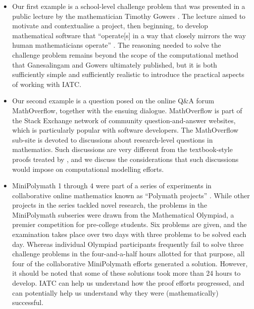 \documentclass[smallextended,oneside]{svjour3}       %
\let\cite\citep
\newcommand\nothing[1]{#1}
\let\paragraph\nothing
\begin{document}

\begin{itemize}
\item Our first example is a school-level challenge problem that was
  presented in a public lecture by the mathematician Timothy Gowers
  \cite{gowers-talk}.  The lecture aimed to motivate and contextualise
  a project, then beginning, to develop mathematical software that
  ``operate[s] in a way that closely mirrors the way human
  mathematicians operate'' \cite[p.~255]{ganesalingam2016fully}.  The
  reasoning needed to solve the challenge problem remains beyond the
  scope of the computational method that Ganesalingam and Gowers
  ultimately published, but it is both sufficiently simple and
  sufficiently realistic to introduce the practical aspects of
  working with IATC.
\item Our second example is a question posed on the online Q\&A forum
  MathOverflow, together with the ensuing dialogue.  MathOverflow is
  part of the Stack Exchange network of community question-and-answer
  websites, which is particularly popular with software developers.
  The MathOverflow sub-site is devoted to discussions about
  research-level questions in mathematics.  Such discussions are very
  different from the textbook-style proofs treated by
  \cite{ganesalingam2016fully}, and we discuss the considerations that
  such discussions would impose on computational modelling efforts.
\item \paragraph{MiniPolymath 1 through 4 were part of a series of
  experiments in collaborative online mathematics known as ``Polymath
  projects'' \cite{polymath-wiki}.}  While other projects in the series
  tackled novel research, the problems in the MiniPolymath subseries
  were drawn from the Mathematical Olympiad, a premier competition for
  pre-college students.
Six problems are given, and the examination takes place over
two days with three problems to be solved each day.
Whereas individual Olympiad participants
frequently fail to solve three challenge problems in the
four-and-a-half hours allotted for that purpose, all four of the
collaborative MiniPolymath efforts generated a solution.
However, it should be noted that some of these solutions
took more than 24 hours to develop.
IATC can help us understand how the proof efforts progressed, and can
potentially help us understand why they were (mathematically)
successful.
\end{itemize}
\end{document}
